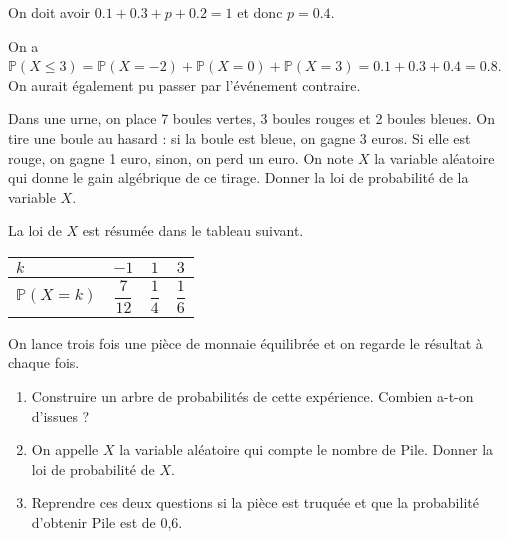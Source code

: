 \documentclass[11pt,fleqn, openany]{book} %
\begin{document}
\begin{solution}On doit avoir $0.1+0.3+p+0.2=1$ et donc $p=0.4$.

On a $\mathbb{P}(X\leqslant 3)=\mathbb{P}(X=-2)+\mathbb{P}(X=0)+\mathbb{P}(X=3)=0.1+0.3+0.4=0.8$. On aurait également pu passer par l'événement contraire.
\end{solution}




\begin{exercise}[topic=prob02]Dans une urne, on place 7 boules vertes, 3 boules rouges et 2 boules bleues. On tire une boule au hasard : si la boule est bleue, on gagne 3 euros. Si elle est rouge, on gagne 1 euro, sinon, on perd un euro. On note $X$ la variable aléatoire qui donne le gain algébrique de ce tirage. Donner la loi de probabilité de la variable $X$.\end{exercise}

\begin{solution}La loi de $X$ est résumée dans le tableau suivant.

\begin{center}
\begin{tabular}{|l|c|c|c|}
\hline
$k$ & $-1$ & $1$ & $3$ \\
\hline
$\mathbb{P}(X=k)$ & $\dfrac{7}{12}$ & $\dfrac{1}{4}$ & $\dfrac{1}{6}$ \\
\hline \end{tabular}
\end{center}\end{solution}




\begin{exercise}[topic=prob02]On lance trois fois une pièce de monnaie équilibrée et on regarde le résultat à chaque fois.
\begin{enumerate}
\item Construire un arbre de probabilités de cette expérience. Combien a-t-on d'issues ? 
\item On appelle $X$ la variable aléatoire qui compte le nombre de Pile. Donner la loi de probabilité de $X$.
\item Reprendre ces deux questions si la pièce est truquée et que la probabilité d'obtenir Pile est de 0,6.
\end{enumerate}\end{exercise}
\end{document}
